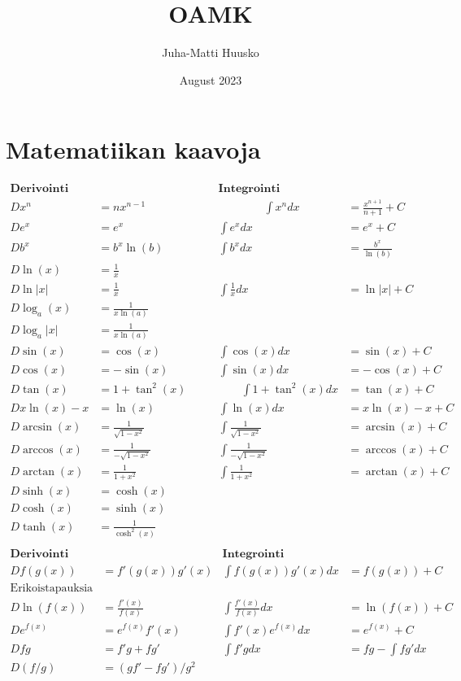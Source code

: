 \documentclass[12pt]{article}
\title{OAMK}
\author{Juha-Matti Huusko}
\date{August 2023}
\begin{document}
\thispagestyle{empty}

\section*{Matematiikan kaavoja}

$$
\begin{array}{rl|rl}
\textbf{Derivointi} && \textbf{Integrointi}&\\[2mm]
Dx^n&=nx^{n-1}     \qquad\qquad&\qquad\qquad\int x^ndx&=\frac{x^{n+1}}{n+1}+C \\[2mm]
De^x&=e^x &\int e^xdx&=e^x+C\\[2mm]
Db^x&=b^x\ln(b) & \int b^xdx&=\frac{b^x}{\ln(b)}\\[2mm]
D\ln(x)&=\frac{1}{x} &&\\[2mm]
D\ln|x|&=\frac{1}{x} &\int\frac{1}{x}dx&=\ln|x|+C\\[2mm]
D\log_a(x)&=\frac{1}{x\ln(a)} &&\\[2mm]
D\log_a|x|&=\frac{1}{x\ln(a)} &&\\[2mm]
D\sin(x)&=\cos(x)   &\int\cos(x)dx&=\sin(x)+C\\[2mm]
D\cos(x)&=-\sin(x)  &\int\sin(x)dx&=-\cos(x)+C\\[2mm]
D\tan(x)&=1+\tan^2(x) \qquad&\qquad\int 1+\tan^2(x)dx&=\tan(x)+C\\[2mm]

Dx\ln(x)-x&=\ln(x) & \int\ln(x)dx&=x\ln(x)-x+C\\[10mm]

D\arcsin(x)&=\frac{1}{\sqrt{1-x^2}} & \int\frac{1}{\sqrt{1-x^2}}&=\arcsin(x)+C\\
D\arccos(x)&=\frac{1}{-\sqrt{1-x^2}} & \int\frac{1}{-\sqrt{1-x^2}}&=\arccos(x)+C\\
D\arctan(x)&=\frac{1}{1+x^2} & \int\frac{1}{1+x^2}&=\arctan(x)+C\\

D\sinh(x)&=\cosh(x) &&\\
D\cosh(x)&=\sinh(x) &&\\
D\tanh(x)&=\frac{1}{\cosh^2(x)} &&\\
\end{array}  
$$
\vspace{1cm}
$$
\begin{array}{rl|rl}
\textbf{Derivointi} && \textbf{Integrointi}&\\[2mm]
D f(g(x))&=f'(g(x))g'(x) & \int f(g(x))g'(x)dx&=f(g(x))+C\\[2mm]
\textrm{Erikoistapauksia} &&&\\
D\ln(f(x))&=\frac{f'(x)}{f(x)} & \int \frac{f'(x)}{f(x)}dx&=\ln(f(x))+C\\[2mm]
D e^{f(x)}&=e^{f(x)}f'(x) & \int f'(x)e^{f(x)}dx&=e^{f(x)}+C\\[10mm]
D fg&=f'g+fg'& \int f'g dx&=fg-\int fg'dx\\[2mm]
D (f/g)&=(gf'-fg')/g^2 &&\\[2mm]
\end{array}  
$$
\end{document}

